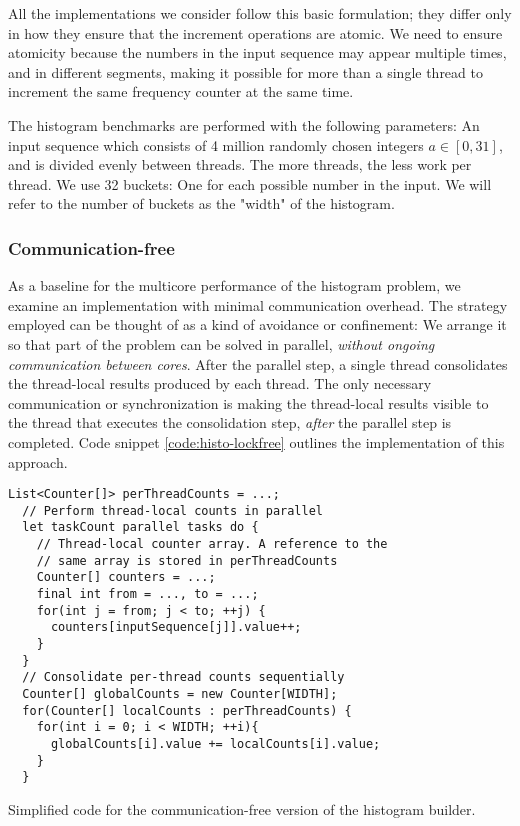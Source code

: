 All the implementations we consider follow this basic formulation; they differ
only in how they ensure that the increment operations are atomic. We need to
ensure atomicity because the numbers in the input sequence may appear multiple
times, and in different segments, making it possible for more than a single
thread to increment the same frequency counter at the same time.

The histogram benchmarks are performed with the following parameters: An input
sequence which consists of 4 million randomly chosen integers $a\in[0,31]$, and
is divided evenly between threads. The more threads, the less work per thread.
We use 32 buckets: One for each possible number in the input. We will refer to
the number of buckets as the "width" of the histogram.

\subsubsection{Communication-free}
As a baseline for the multicore performance of the histogram problem, we examine
an implementation with minimal communication overhead. The strategy employed can
be thought of as a kind of avoidance or confinement: We arrange it so that part
of the problem can be solved in parallel, \textit{without ongoing communication
between cores}. After the parallel step, a single thread consolidates the
thread-local results produced by each thread. The only necessary communication
or synchronization is making the thread-local results visible to the thread that
executes the consolidation step, \textit{after} the parallel step is completed.
Code snippet \ref{code:histo-lockfree} outlines the implementation of this
approach.

\begin{code}
\begin{Verbatim}[frame=single]
  List<Counter[]> perThreadCounts = ...;
  // Perform thread-local counts in parallel
  let taskCount parallel tasks do {
    // Thread-local counter array. A reference to the
    // same array is stored in perThreadCounts
    Counter[] counters = ...;
    final int from = ..., to = ...;
    for(int j = from; j < to; ++j) {
      counters[inputSequence[j]].value++;
    }
  }
  // Consolidate per-thread counts sequentially
  Counter[] globalCounts = new Counter[WIDTH];
  for(Counter[] localCounts : perThreadCounts) {
    for(int i = 0; i < WIDTH; ++i){
      globalCounts[i].value += localCounts[i].value;
    }
  }
\end{Verbatim}
	\caption{Simplified code for the communication-free version of the
	histogram builder.}
	\label{code:histo-lockfree}
\end{code}

